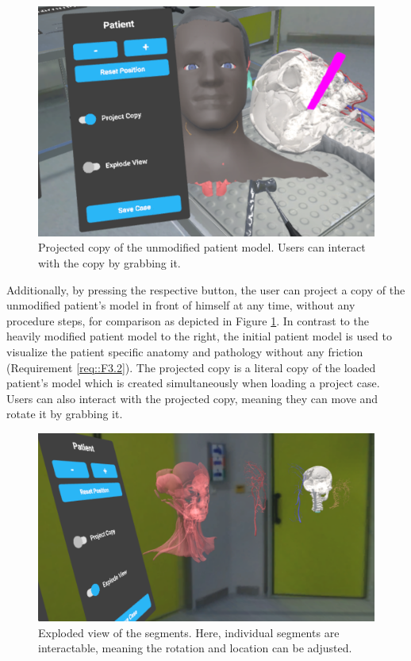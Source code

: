\begin{figure}[ht]
  \centering
  \includegraphics[width=\linewidth]{images/implementation/features/visualization/project_copy.png}
  \caption{\label{fig::ProjectCopy} Projected copy of the unmodified patient model. Users can interact with the copy by grabbing it.}
\end{figure}

Additionally, by pressing the respective button, the user can project a copy of the unmodified patient's model in front of himself at any time, without any procedure steps, for comparison as 
depicted in Figure \ref{fig::ProjectCopy}.
In contrast to the heavily modified patient model to the right, the initial patient model is used to visualize the patient specific anatomy and pathology without any 
friction (Requirement \ref{req::F3.2}).
The projected copy is a literal copy of the loaded patient's model which is created simultaneously when loading a project case.
Users can also interact with the projected copy, meaning they can move and rotate it by grabbing it.

\begin{figure}[ht]
  \centering
  \includegraphics[width=\linewidth]{images/implementation/features/visualization/explode_view.png}
  \caption{\label{fig::ExplodeView} Exploded view of the segments. Here, individual segments are interactable, meaning the rotation and location can be adjusted.}
\end{figure}


